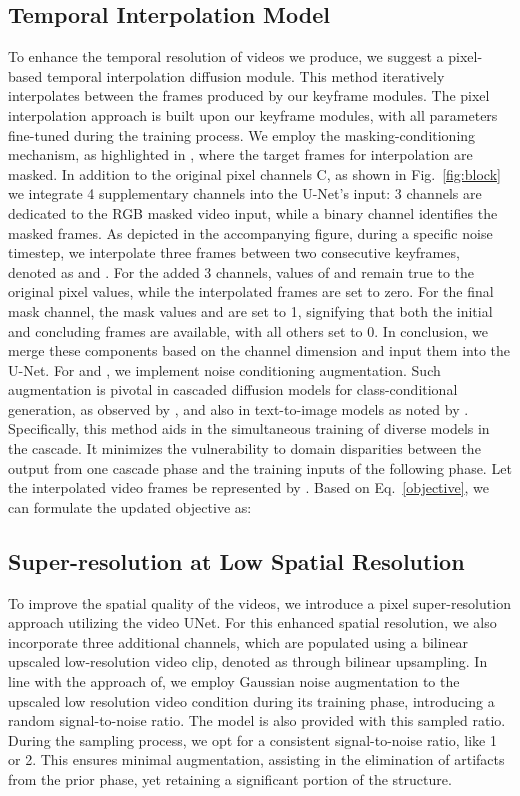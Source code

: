 \documentclass{article} \usepackage{iclr2024_conference,times}
\begin{document}
\subsection{Temporal Interpolation Model}

To enhance the temporal resolution of videos we produce, we suggest a pixel-based temporal interpolation diffusion module. This method iteratively interpolates between the frames produced by our keyframe modules. The pixel interpolation approach is built upon our keyframe modules, with all parameters fine-tuned during the training process. We employ the masking-conditioning mechanism, as highlighted in \citep{blattmann2023align}, where the target frames for interpolation are masked. In addition to the original pixel channels C, as shown in Fig.~\ref{fig:block} we integrate 4 supplementary channels into the U-Net's input: 3 channels are dedicated to the RGB masked video input, while a binary channel identifies the masked frames. As depicted in the accompanying figure, during a specific noise timestep, we interpolate three frames between two consecutive keyframes, denoted as  and . For the added 3 channels, values of  and  remain true to the original pixel values, while the interpolated frames are set to zero. For the final mask channel, the mask values  and  are set to 1, signifying that both the initial and concluding frames are available, with all others set to 0. In conclusion, we merge these components based on the channel dimension and input them into the U-Net. For  and , we implement noise conditioning augmentation. Such augmentation is pivotal in cascaded diffusion models for class-conditional generation, as observed by \citep{ho2022imagen}, and also in text-to-image models as noted by \citep{he2022latent}. Specifically, this method aids in the simultaneous training of diverse models in the cascade. It minimizes the vulnerability to domain disparities between the output from one cascade phase and the training inputs of the following phase. Let the interpolated video frames be represented by . Based on Eq.~\ref{objective}, we can formulate the updated objective as:


\label{inter}

\vspace{-5mm}
\subsection{Super-resolution at Low Spatial Resolution}
To improve the spatial quality of the videos, we introduce a pixel super-resolution approach utilizing the video UNet. For this enhanced spatial resolution, we also incorporate three additional channels, which are populated using a bilinear upscaled low-resolution video clip, denoted as   through bilinear upsampling. In line with the approach of\citep{ho2022video}, we employ Gaussian noise augmentation to the upscaled low resolution video condition during its training phase, introducing a random signal-to-noise ratio. The model is also provided with this sampled ratio. During the sampling process, we opt for a consistent signal-to-noise ratio, like 1 or 2. This ensures minimal augmentation, assisting in the elimination of artifacts from the prior phase, yet retaining a significant portion of the structure.
\end{document}
